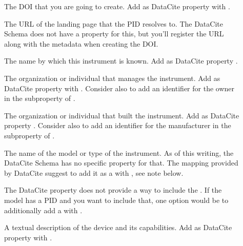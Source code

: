 \documentclass[a4paper,10pt,english]{sphinxmanual}
\begin{document}
\begin{description}
\item[{}] \leavevmode
\sphinxAtStartPar
The DOI that you are going to create.  Add as DataCite property
 with .

\item[{}] \leavevmode
\sphinxAtStartPar
The URL of the landing page that the PID resolves to.  The DataCite
Schema does not have a property for this, but you’ll register the
URL along with the metadata when creating the DOI.

\item[{}] \leavevmode
\sphinxAtStartPar
The name by which this instrument is known.  Add as DataCite property
.

\item[{}] \leavevmode
\sphinxAtStartPar
The organization or individual that manages the instrument.  Add as
DataCite property  with
.  Consider also to add an
identifier for the owner in the  subproperty of
.

\item[{}] \leavevmode
\sphinxAtStartPar
The organization or individual that built the instrument.  Add as
DataCite property .  Consider also to add an identifier for
the manufacturer in the  subproperty of .

\item[{}] \leavevmode
\sphinxAtStartPar
The name of the model or type of the instrument.  As of this
writing, the DataCite Schema has no specific property for that.  The
mapping provided by DataCite suggest to add it as a 
with , see note below.

\sphinxAtStartPar
The DataCite property  does not provide a way to
include the .  If the model has a PID and you want
to include that, one option would be to additionally add a
 with .

\item[{}] \leavevmode
\sphinxAtStartPar
A textual description of the device and its capabilities.  Add as
DataCite property  with .


\end{description}
\end{document}
